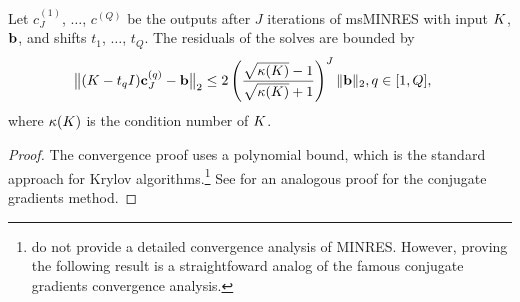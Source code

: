 \begin{lemma}
  Let $c^{(1)}_J$, $\ldots$, $c^{(Q)}$ be the outputs after $J$ iterations of msMINRES with input $K$, $\mathbf{b}$, and shifts $t_1$, $\ldots$, $t_Q$.
  The residuals of the solves are bounded by
  \begin{align*}
    \bigl\Vert (K - t_q I) \mathbf{c}_J^{(q)} - \mathbf{b} \bigr\Vert_2
    &\leq 2 \left( \frac{
      \sqrt{\kappa(K)} - 1
    }{
      \sqrt{\kappa(K)} + 1
    }\right)^J
    \Vert \mathbf{b} \Vert_2,
    q \in [1, Q],
	\end{align*}
  where $\kappa(K)$ is the condition number of $K$.
  \label{lemma:minres}
\end{lemma}
%
\begin{proof}
  The convergence proof uses a polynomial bound, which is the standard approach for Krylov algorithms.\footnote{
    \citet{paige1975solution} do not provide a detailed convergence analysis of MINRES.
    However, proving the following result is a straightfoward analog of the famous conjugate gradients convergence analysis.
  }
  See \citep[e.g.][]{shewchuk1994introduction,trefethen1997numerical,saad2003iterative} for an analogous proof for the conjugate gradients method.


\end{proof}
